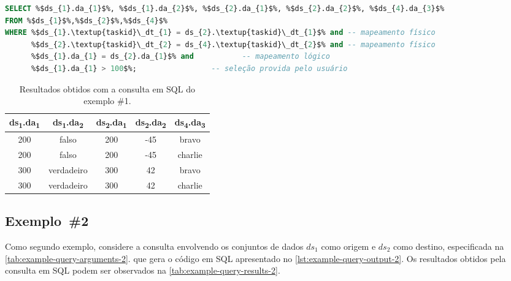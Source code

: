 \begin{minipage}[c]{0.95\textwidth}
\begin{lstlisting}[language=sql,label={lst:example-query-output-1},caption={[Código SQ gerado no exemplo~\#1]Código SQL gerado pela função \texttt{generateSqlQuery} no exemplo~\#1.}]
SELECT %$ds_{1}.da_{1}$%, %$ds_{1}.da_{2}$%, %$ds_{2}.da_{1}$%, %$ds_{2}.da_{2}$%, %$ds_{4}.da_{3}$%
FROM %$ds_{1}$%,%$ds_{2}$%,%$ds_{4}$%
WHERE %$ds_{1}.\textup{taskid}\_dt_{1} = ds_{2}.\textup{taskid}\_dt_{1}$% and -- mapeamento físico
      %$ds_{2}.\textup{taskid}\_dt_{2} = ds_{4}.\textup{taskid}\_dt_{2}$% and -- mapeamento físico
      %$ds_{1}.da_{1} = ds_{2}.da_{1}$% and           -- mapeamento lógico
      %$ds_{1}.da_{1} > 100$%;                 -- seleção provida pelo usuário
\end{lstlisting}
\end{minipage}

\begin{table}[htb]
    \centering
    \begin{tabular}{c|c|c|c|c}
\textbf{ds\textsubscript{1}.da\textsubscript{1}} & \textbf{ds\textsubscript{1}.da\textsubscript{2}} & \textbf{ds\textsubscript{2}.da\textsubscript{1}} & \textbf{ds\textsubscript{2}.da\textsubscript{2}} & \textbf{ds\textsubscript{4}.da\textsubscript{3}} \\ \hline
200              & falso            & 200              & -45              & bravo            \\
200              & falso            & 200              & -45              & charlie          \\
300              & verdadeiro       & 300              & 42               & bravo            \\
300              & verdadeiro       & 300              & 42               & charlie         
    \end{tabular}
    \caption[Resultados obtidos com a consulta em SQL do exemplo \#1]{Resultados obtidos com a consulta em SQL do exemplo \#1.}
    \label{tab:example-query-results-1}
\end{table}

\subsection{Exemplo~\#2}

Como segundo exemplo, considere a consulta envolvendo os conjuntos de dados $ds_1$ como origem e $ds_2$ como destino, especificada na \autoref{tab:example-query-arguments-2}. que gera o código em SQL apresentado no \autoref{lst:example-query-output-2}. Os resultados obtidos pela consulta em SQL podem ser observados na \autoref{tab:example-query-results-2}.

